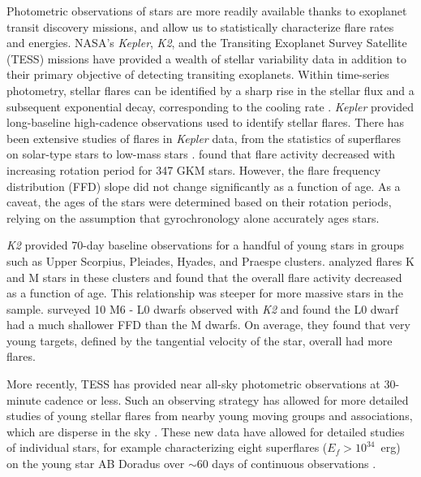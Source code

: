 \documentclass[twocolumn]{aastex631}
\begin{document}
Photometric observations of stars are more readily available thanks to exoplanet transit discovery missions, and allow us to statistically characterize flare rates and energies. NASA's \textit{Kepler}, \textit{K2}, and the Transiting Exoplanet Survey Satellite (TESS) missions have provided a wealth of stellar variability data in addition to their primary objective of detecting transiting exoplanets.  Within time-series photometry, stellar flares can be identified by a sharp rise in the stellar flux and a subsequent exponential decay, corresponding to the cooling rate \citep{}. \textit{Kepler} \citep{Borucki10} provided long-baseline high-cadence observations used to identify stellar flares. There has been extensive studies of flares in \textit{Kepler} data, from the statistics of superflares on solar-type stars \citep[e.g.][]{notsu13, shibayama13, maehara15, okamoto21} to low-mass stars \citep[e.g.][]{Hawley14, silverberg16}. \cite{davenport19} found that flare activity decreased with increasing rotation period for 347 GKM stars. However, the flare frequency distribution (FFD) slope did not change significantly as a function of age. As a caveat, the ages of the stars were determined based on their rotation periods, relying on the assumption that gyrochronology alone accurately ages stars.

\textit{K2} provided 70-day baseline observations for a handful of young stars in groups such as Upper Scorpius,  Pleiades, Hyades, and Praespe clusters. \cite{ilin19, ilin21} analyzed flares K and M stars in these clusters and found that the overall flare activity decreased as a function of age. This relationship was steeper for more massive stars in the sample. \cite{paudel18} surveyed 10 M6 - L0 dwarfs observed with \textit{K2} and found the L0 dwarf had a much shallower FFD than the M dwarfs. On average, they found that very young targets, defined by the tangential velocity of the star, overall had more flares.

More recently, TESS \citep{ricker15} has provided near all-sky photometric observations at 30-minute cadence or less. Such an observing strategy has allowed for more detailed studies of young stellar flares from nearby young moving groups and associations, which are disperse in the sky \citep{gagne18}. These new data have allowed for detailed studies of individual stars, for example characterizing eight superflares ($E_f > 10^{34}$~erg) on the young star AB Doradus over $\sim 60$ days of continuous observations \citep{schmitt19}.
\end{document}
